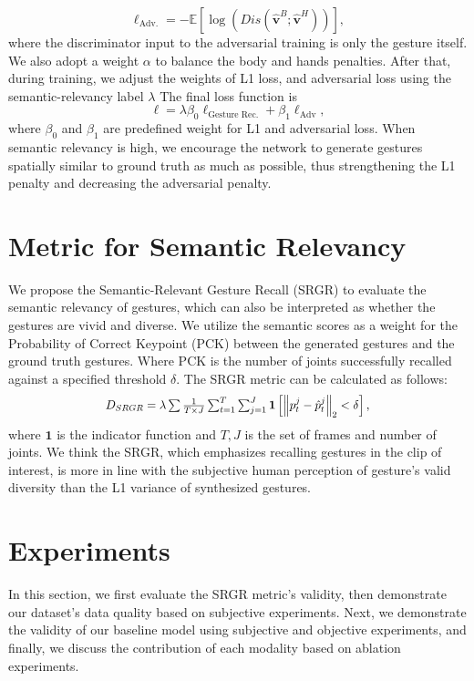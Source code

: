 \documentclass[runningheads]{llncs}
\begin{document}
\begin{equation}
\ell_\text{Adv.}=-\mathbb{E}[\log (Dis(\hat{\textbf{v}}^{B};\hat{\textbf{v}}^{H}))],
\end{equation} where the discriminator input to the adversarial training is only the gesture itself. We also adopt a weight $\alpha$ to balance the body and hands penalties. After that, during training, we adjust the weights of L1 loss, and adversarial loss using the semantic-relevancy label $\lambda$ The final loss function is \begin{equation}
\ell=\lambda \beta_{0} \ell_{\text {Gesture Rec.}}+\beta_{1} \ell_{\text {Adv}},
\label{eq12}
\end{equation} where $\beta_{0}$ and $\beta_{1}$ are predefined weight for L1 and adversarial loss. When semantic relevancy is high, we encourage the network to generate gestures spatially similar to ground truth as much as possible, thus strengthening the L1 penalty and decreasing the adversarial penalty.  \section{Metric for Semantic Relevancy}
We propose the Semantic-Relevant Gesture Recall (SRGR) to evaluate the semantic relevancy of gestures, which can also be interpreted as whether the gestures are vivid and diverse. We utilize the semantic scores as a weight for the Probability of Correct Keypoint (PCK) between the generated gestures and the ground truth gestures. Where PCK is the number of joints successfully recalled against a specified threshold $\delta$. The SRGR metric can be calculated as follows:
\begin{equation}
\resizebox{.60\hsize}{!}{$
    D_{SRGR} = \lambda \sum \frac{1}{T \times J} \sum_{t=1}^{T} \sum_{j=1}^{J} \mathbf{1}\left[\left\|p_{t}^{j}-\hat{p}_{t}^{j}\right\|_{2}<\delta\right],$} 
\end{equation}
where $\mathbf{1}$ is the indicator function and $T, J$ is the set of frames and number of joints. 
We think the SRGR, which emphasizes recalling gestures in the clip of interest, is more in line with the subjective human perception of gesture's valid diversity than the L1 variance of synthesized gestures. 
\vspace{-0.5cm}
 \section{Experiments}
In this section, we first evaluate the SRGR metric's validity, then demonstrate our dataset's data quality based on subjective experiments. Next, we demonstrate the validity of our baseline model using subjective and objective experiments, and finally, we discuss the contribution of each modality based on ablation experiments.
\end{document}
